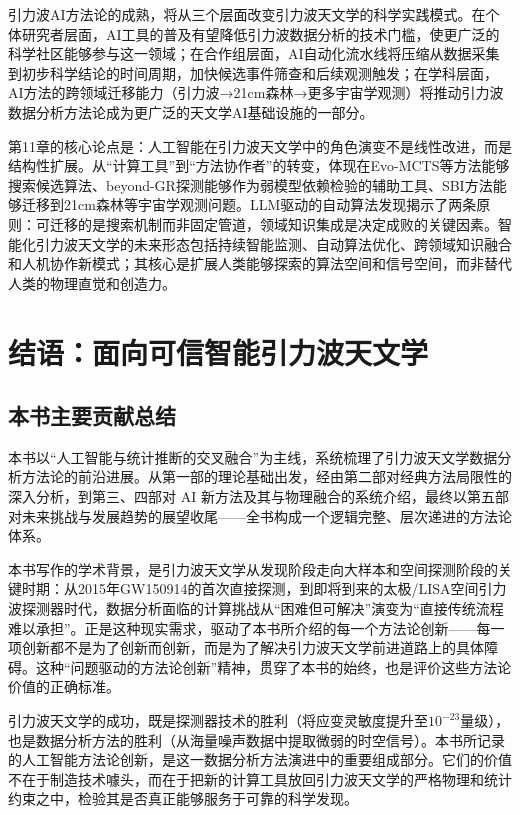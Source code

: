 引力波AI方法论的成熟，将从三个层面改变引力波天文学的科学实践模式。在个体研究者层面，AI工具的普及有望降低引力波数据分析的技术门槛，使更广泛的科学社区能够参与这一领域；在合作组层面，AI自动化流水线将压缩从数据采集到初步科学结论的时间周期，加快候选事件筛查和后续观测触发；在学科层面，AI方法的跨领域迁移能力（引力波→21cm森林→更多宇宙学观测）将推动引力波数据分析方法论成为更广泛的天文学AI基础设施的一部分。

第11章的核心论点是：人工智能在引力波天文学中的角色演变不是线性改进，而是结构性扩展。从“计算工具”到“方法协作者”的转变，体现在Evo-MCTS等方法能够搜索候选算法、beyond-GR探测能够作为弱模型依赖检验的辅助工具、SBI方法能够迁移到21cm森林等宇宙学观测问题。LLM驱动的自动算法发现揭示了两条原则：可迁移的是搜索机制而非固定管道，领域知识集成是决定成败的关键因素。智能化引力波天文学的未来形态包括持续智能监测、自动算法优化、跨领域知识融合和人机协作新模式；其核心是扩展人类能够探索的算法空间和信号空间，而非替代人类的物理直觉和创造力。

\chapter{结语：面向可信智能引力波天文学}

\section{本书主要贡献总结}

本书以“人工智能与统计推断的交叉融合”为主线，系统梳理了引力波天文学数据分析方法论的前沿进展。从第一部的理论基础出发，经由第二部对经典方法局限性的深入分析，到第三、四部对 AI 新方法及其与物理融合的系统介绍，最终以第五部对未来挑战与发展趋势的展望收尾——全书构成一个逻辑完整、层次递进的方法论体系。

本书写作的学术背景，是引力波天文学从发现阶段走向大样本和空间探测阶段的关键时期：从2015年GW150914的首次直接探测，到即将到来的太极/LISA空间引力波探测器时代，数据分析面临的计算挑战从“困难但可解决”演变为“直接传统流程难以承担”。正是这种现实需求，驱动了本书所介绍的每一个方法论创新——每一项创新都不是为了创新而创新，而是为了解决引力波天文学前进道路上的具体障碍。这种“问题驱动的方法论创新”精神，贯穿了本书的始终，也是评价这些方法论价值的正确标准。

引力波天文学的成功，既是探测器技术的胜利（将应变灵敏度提升至$10^{-23}$量级），也是数据分析方法的胜利（从海量噪声数据中提取微弱的时空信号）。本书所记录的人工智能方法论创新，是这一数据分析方法演进中的重要组成部分。它们的价值不在于制造技术噱头，而在于把新的计算工具放回引力波天文学的严格物理和统计约束之中，检验其是否真正能够服务于可靠的科学发现。

